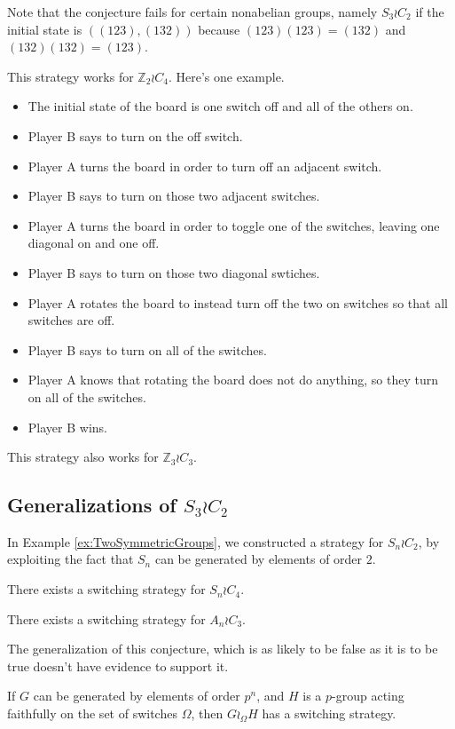 Note that the conjecture fails for certain nonabelian groups, namely
$S_3 \wr C_2$ if the initial state is $((123),(132))$ because
$(123)(123) = (132)$ and $(132)(132) = (123)$.

\begin{example} This strategy works for $\mathbb Z_2 \wr C_4$. Here's one example.
  \begin{itemize}
    \item The initial state of the board is one switch off and all of the others on.
    \item Player B says to turn on the off switch.
    \item Player A turns the board in order to turn off an adjacent switch.
    \item Player B says to turn on those two adjacent switches.
    \item Player A turns the board in order to toggle one of the switches, leaving one diagonal on and one off.
    \item Player B says to turn on those two diagonal swtiches.
    \item Player A rotates the board to instead turn off the two on switches so that all switches are off.
    \item Player B says to turn on all of the switches.
    \item Player A knows that rotating the board does not do anything, so they turn on all of the switches.
    \item Player B wins.
  \end{itemize}
\end{example}

This strategy also works for $\mathbb Z_3 \wr C_3$.

\subsection{Generalizations of \texorpdfstring{$S_3 \wr C_2$}{Two interchangeable copies of the symmetric group}}

In Example \ref{ex:TwoSymmetricGroups}, we constructed a strategy for $S_n \wr C_2$,
by exploiting the fact that $S_n$ can be generated by elements of order $2$.

\begin{conjecture}
  There exists a switching strategy for $S_n \wr C_4$.
\end{conjecture}

\begin{conjecture}
  There exists a switching strategy for $A_n \wr C_3$.
\end{conjecture}

The generalization of this conjecture, which is as likely to be false as it is
to be true doesn't have evidence to support it.
\begin{conjecture}
  If $G$ can be generated by elements of order $p^n$, and $H$ is a $p$-group
  acting faithfully on the set of switches $\Omega$, then $G \wr_\Omega H$ has
  a switching strategy.
\end{conjecture}
